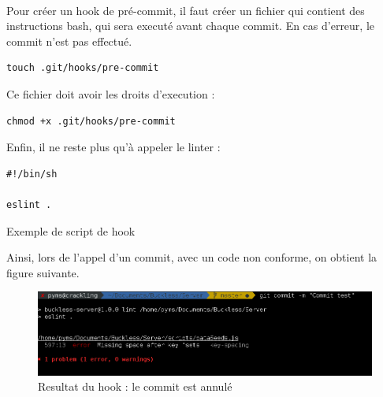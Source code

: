         \paragraph{}
            Pour créer un hook de pré-commit, il faut créer un fichier qui contient des instructions bash,
            qui sera executé avant chaque commit. En cas d'erreur, le commit n'est pas effectué.

            \begin{verbatim}
touch .git/hooks/pre-commit
            \end{verbatim}

            Ce fichier doit avoir les droits d'execution :

            \begin{verbatim}
chmod +x .git/hooks/pre-commit
            \end{verbatim}

            Enfin, il ne reste plus qu'à appeler le linter :

            \begin{listing}[ht]
                \begin{verbatim}
#!/bin/sh

eslint .
                \end{verbatim}
                \caption{Exemple de script de hook}
            \end{listing}

            Ainsi, lors de l'appel d'un commit, avec un code non conforme, on obtient la figure suivante.

            \begin{figure}[ht]
                \centering
                \includegraphics[width=\textwidth]{./assets/hook.png}
                \caption{Resultat du hook : le commit est annulé}
            \end{figure}

